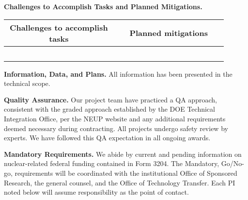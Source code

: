 \documentclass[11pt,letterpaper]{article}
\begin{document}
\vspace{0.5\baselineskip}


\noindent\textbf{Challenges to Accomplish Tasks and Planned Mitigations.} 

\vspace{0.5\baselineskip}

\begin{table}[H]
    \centering
    \begin{tabular}{|p{0.45\linewidth}|p{0.45\linewidth}|}
        \hline
        \multicolumn{1}{|c|}{\textbf{Challenges to accomplish tasks}}
        &\multicolumn{1}{|c|}{\textbf{Planned mitigations}}
        \\
        \hline
        
        & 
        \\
        \hline
        
        & 
        \\
        \hline
        
        & 
        \\
        \hline
        
        & 
        \\
        \hline
        
        & 
        \\
        \hline
    \end{tabular}
    \label{tab-milestones}
\end{table}

\vspace{0.5\baselineskip}

\noindent\textbf{Information, Data, and Plans.} All information has been presented in the technical scope.

\vspace{0.5\baselineskip}

\noindent\textbf{Quality Assurance.} Our project team have practiced a QA approach, consistent with the graded approach established by the DOE Technical Integration Office, per the NEUP website and any additional requirements deemed necessary during contracting. All projects undergo safety review by experts. We have followed this QA expectation in all ongoing awards.

\vspace{0.5\baselineskip}

\noindent\textbf{Mandatory Requirements.} We abide by current and pending information on nuclear-related federal funding contained in Form 3204. The Mandatory, Go/No-go, requirements will be coordinated with the institutional Office of Sponsored Research, the general counsel, and the Office of Technology Transfer. Each PI noted below will assume responsibility as the point of contact.
\end{document}
